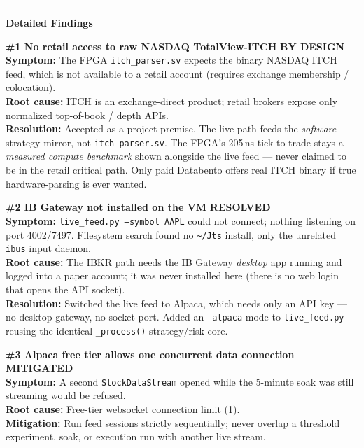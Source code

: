 \documentclass[10pt,a4paper]{article}
\newcommand{\fixed}{\textcolor{okgreen}{\textbf{RESOLVED}}}
\newcommand{\mitig}{\textcolor{warnamber}{\textbf{MITIGATED}}}
\newcommand{\bydesign}{\textcolor{accentteal}{\textbf{BY DESIGN}}}
\newcommand{\sectionrule}{\vspace{2pt}\textcolor{rulegray}{\rule{\linewidth}{0.8pt}}\vspace{2pt}}
\begin{document}
\sectionrule

{\large\bfseries\color{hdrblue} Detailed Findings}

\begin{issuebox}
\textbf{\#1 \quad No retail access to raw NASDAQ TotalView-ITCH} \hfill \bydesign\\
\textbf{Symptom:} The FPGA \texttt{itch\_parser.sv} expects the binary NASDAQ
ITCH feed, which is not available to a retail account (requires exchange
membership / colocation).\\
\textbf{Root cause:} ITCH is an exchange-direct product; retail brokers expose
only normalized top-of-book / depth APIs.\\
\textbf{Resolution:} Accepted as a project premise. The live path feeds the
\emph{software} strategy mirror, not \texttt{itch\_parser.sv}. The FPGA's
205\,ns tick-to-trade stays a \emph{measured compute benchmark} shown alongside
the live feed --- never claimed to be in the retail critical path. Only paid
Databento offers real ITCH binary if true hardware-parsing is ever wanted.
\end{issuebox}

\begin{issuebox}
\textbf{\#2 \quad IB Gateway not installed on the VM} \hfill \fixed\\
\textbf{Symptom:} \texttt{live\_feed.py --symbol AAPL} could not connect; nothing
listening on port 4002/7497. Filesystem search found no \texttt{\~{}/Jts} install,
only the unrelated \texttt{ibus} input daemon.\\
\textbf{Root cause:} The IBKR path needs the IB Gateway \emph{desktop} app
running and logged into a paper account; it was never installed here (there is
no web login that opens the API socket).\\
\textbf{Resolution:} Switched the live feed to Alpaca, which needs only an API
key --- no desktop gateway, no socket port. Added an \texttt{--alpaca} mode to
\texttt{live\_feed.py} reusing the identical \texttt{\_process()} strategy/risk core.
\end{issuebox}

\begin{issuebox}
\textbf{\#3 \quad Alpaca free tier allows one concurrent data connection} \hfill \mitig\\
\textbf{Symptom:} A second \texttt{StockDataStream} opened while the 5-minute soak
was still streaming would be refused.\\
\textbf{Root cause:} Free-tier websocket connection limit (1).\\
\textbf{Mitigation:} Run feed sessions strictly sequentially; never overlap a
threshold experiment, soak, or execution run with another live stream.
\end{issuebox}
\end{document}
